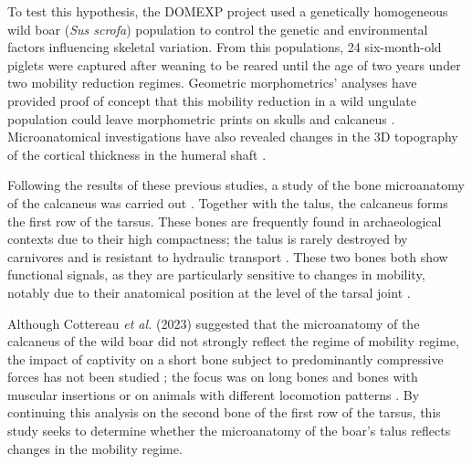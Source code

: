 \documentclass[12pt,a4paper]{article}
\begin{document}
To test this hypothesis, the DOMEXP project used a genetically homogeneous wild boar (\textit{Sus scrofa}) population to control the genetic and environmental factors influencing skeletal variation. From this populations, 24 six-month-old piglets were captured after weaning to be reared until the age of two years under two mobility reduction regimes. Geometric morphometrics’ analyses have provided proof of concept that this mobility reduction in a wild ungulate population could leave morphometric prints on skulls \cite{neauxHowChangesFunctional2021t} and calcaneus \cite{harbersMarkCaptivityPlastic2020t}. Microanatomical investigations have also revealed changes in the 3D topography of the cortical thickness in the humeral shaft \cite{harbersInvestigatingImpactCaptivity2020ab}.

Following the results of these previous studies, a study of the bone microanatomy of the calcaneus was carried out \cite{cottereauCanGrowthCaptivity2023ab}. Together with the talus, the calcaneus forms the first row of the tarsus. These bones are frequently found in archaeological contexts due to their high compactness; the talus is rarely destroyed by carnivores \cite{brainHuntersHuntedIntroduction1983} and is resistant to hydraulic transport \cite{barrPaleoenvironmentsShunguraFormation2015t,behrensmeyerTaphonomicEcologicInformation1978b}. These two bones both show functional signals, as they are particularly sensitive to changes in mobility, notably due to their anatomical position at the level of the tarsal joint \cite{alexanderPrinciplesLigamentFunction1987,barrFunctionalMorphologyBovid2014o,etienneInfluenceMassTarsus2020v,lanyonAnalysisSurfaceBone1973c,schaefferOriginMammalianOrdinal1948c,skedrosModelingRemodelingDeveloping2001b,suLoadingConditionsCortical1999}.

Although Cottereau \textit{et al.} (2023) suggested that the microanatomy of the calcaneus of the wild boar did not strongly reflect the regime of mobility regime, the impact of captivity on a short bone subject to predominantly compressive forces has not been studied ; the focus was on long bones \cite{chirchirTrabecularBoneDomestic2021g,chirchirEffectsReducedMobility2022h,pelletierInfluenceCaptivitySelection2021d} and bones with muscular insertions \cite{jingMorphologicMechanicalAdaptive2024e} or on animals with different locomotion patterns \cite{zackEffectCaptivityVertebral2022}. By continuing this analysis on the second bone of the first row of the tarsus, this study seeks to determine whether the microanatomy of the boar's talus reflects changes in the mobility regime.
\end{document}
